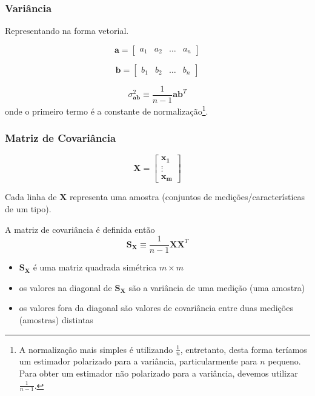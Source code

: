 \begin{frame}[allowframebreaks]
  \frametitle{Variância}
  Representando na forma vetorial.

  \begin{equation}
  \mathbf{a} = \begin{bmatrix} a_1 & a_2 & \ldots & a_n \end{bmatrix}
  \end{equation}

  \begin{equation}
  \mathbf{b} = \begin{bmatrix} b_1 & b_2 & \ldots & b_n \end{bmatrix}
  \end{equation}


  \begin{equation}
  \sigma_{\mathbf{ab}}^2 \equiv \frac{1}{n-1} \mathbf{ab}^T
  \end{equation}
  onde o primeiro termo é a constante de normalização\footnote{A normalização mais
  simples é utilizando $\frac{1}{n}$, entretanto, desta forma teríamos um estimador
  polarizado para a variância, particularmente para $n$ pequeno. Para obter um estimador
  não polarizado para a variância, devemos utilizar $\frac{1}{n-1}$.}.

\end{frame} 

\begin{frame}[allowframebreaks]
  \frametitle{Matriz de Covariância}

  \begin{equation}
  \mathbf{X} = \begin{bmatrix} \mathbf{x_1} \\ \vdots \\ \mathbf{x_m} \end{bmatrix}
  \end{equation}

  Cada linha de $\mathbf{X}$ representa uma amostra (conjuntos de medições/características de um tipo).

  A matriz de covariância é definida então
  \begin{equation}
  \mathbf{S_X} \equiv \frac{1}{n-1} \mathbf{X} \mathbf{X}^T
  \end{equation}

  \begin{itemize}
  \item $\mathbf{S_X}$ é uma matriz quadrada simétrica $m \times m$
  \item os valores na diagonal de $\mathbf{S_X}$ são a variância de uma medição (uma amostra)
  \item os valores fora da diagonal são valores de covariância entre duas medições (amostras) distintas 
  \end{itemize}
\end{frame}



